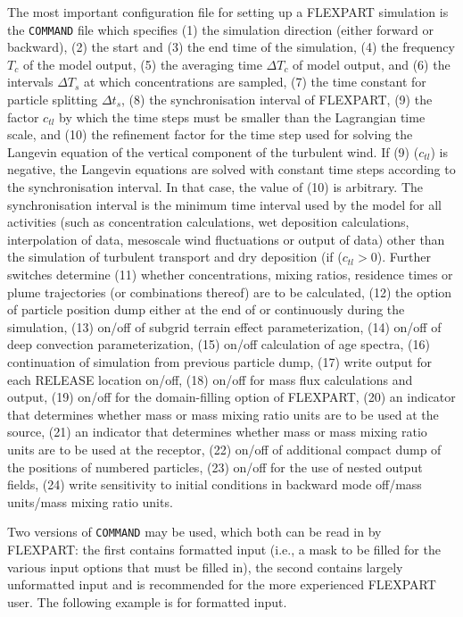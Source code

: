 \documentclass{egu}                  %
\begin{document}
The most important configuration file for setting up a FLEXPART simulation is
the \verb|COMMAND| file which specifies (1) the simulation direction (either
forward or backward), (2) the start and (3) the end time of the simulation, (4)
the frequency $T_c$ of the model output, (5) the averaging time $\Delta T_c$ of
model output, and (6) the intervals $\Delta T_s$ at which concentrations are
sampled, (7) the time constant for particle splitting $\Delta t_s$, (8) the
synchronisation interval of FLEXPART, (9) the factor $c_{tl}$ by which the time
steps must be smaller than the Lagrangian time scale, and (10) the refinement
factor for the time step used for solving the Langevin equation of the vertical
component of the turbulent wind.  If (9) ($c_{tl}$) is negative, the Langevin
equations are solved with constant time steps according to the synchronisation
interval.  In that case, the value of (10) is arbitrary.  The synchronisation
interval is the minimum time interval used by the model for all activities
(such as concentration calculations, wet deposition calculations, interpolation
of data, mesoscale wind fluctuations or output of data) other than the
simulation of turbulent transport and dry deposition (if ($c_{tl}>0$).  Further
switches determine (11) whether concentrations, mixing ratios, residence times
or plume trajectories (or combinations thereof) are to be calculated, (12) the
option of particle position dump either at the end of or continuously during
the simulation, (13) on/off of subgrid terrain effect parameterization, (14)
on/off of deep convection parameterization, (15) on/off calculation of age
spectra, (16) continuation of simulation from previous particle dump, (17)
write output for each RELEASE location on/off, (18) on/off for mass flux
calculations and output, (19) on/off for the domain-filling option of FLEXPART,
(20) an indicator that determines whether mass or mass mixing ratio units are
to be used at the source, (21) an indicator that determines whether mass or
mass mixing ratio units are to be used at the receptor, (22) on/off of
additional compact dump of the positions of numbered particles, (23) on/off for
the use of nested output fields, (24) write sensitivity to initial conditions
in backward mode off/mass units/mass mixing ratio units.

Two versions of \verb|COMMAND| may be used, which both can be read in by
FLEXPART: the first contains formatted input (i.e., a mask to be filled for the
various input options that must be filled in), the second contains largely
unformatted input and is recommended for the more experienced FLEXPART user.
The following example is for formatted input.
\end{document}
